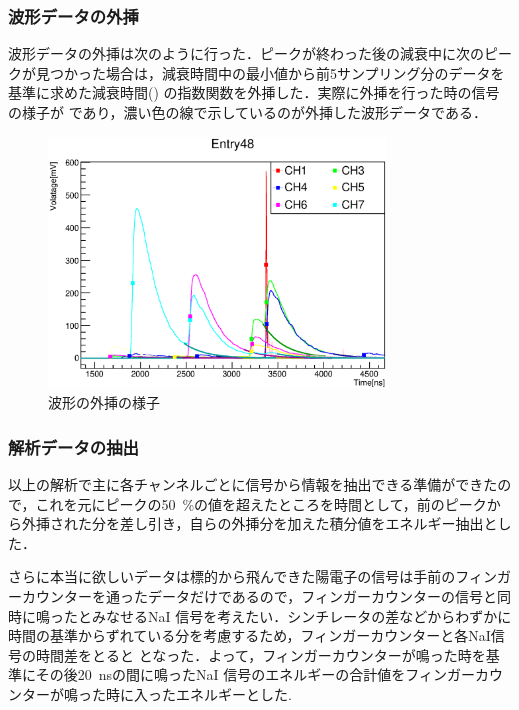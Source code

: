 \subsubsection{波形データの外挿}
波形データの外挿は次のように行った．ピークが終わった後の減衰中に次のピークが見つかった場合は，減衰時間中の最小値から前5サンプリング分のデータを基準に求めた減衰時間() の指数関数を外挿した．実際に外挿を行った時の信号の様子が であり，濃い色の線で示しているのが外挿した波形データである．

\begin{figure}[hbt]
\centering
\includegraphics[width=0.8\textwidth]{figure/hatano/analysis.eps}
\caption{波形の外挿の様子}
\label{hatano_fig:analysis}
\end{figure}

\subsubsection{解析データの抽出}
以上の解析で主に各チャンネルごとに信号から情報を抽出できる準備ができたので，これを元にピークの50~\%の値を超えたところを時間として，前のピークから外挿された分を差し引き，自らの外挿分を加えた積分値をエネルギー抽出とした．

さらに本当に欲しいデータは標的から飛んできた陽電子の信号は手前のフィンガーカウンターを通ったデータだけであるので，フィンガーカウンターの信号と同時に鳴ったとみなせるNaI 信号を考えたい．シンチレータの差などからわずかに時間の基準からずれている分を考慮するため，フィンガーカウンターと各NaI信号の時間差をとると となった．よって，フィンガーカウンターが鳴った時を基準にその後20~nsの間に鳴ったNaI 信号のエネルギーの合計値をフィンガーカウンターが鳴った時に入ったエネルギーとした.

